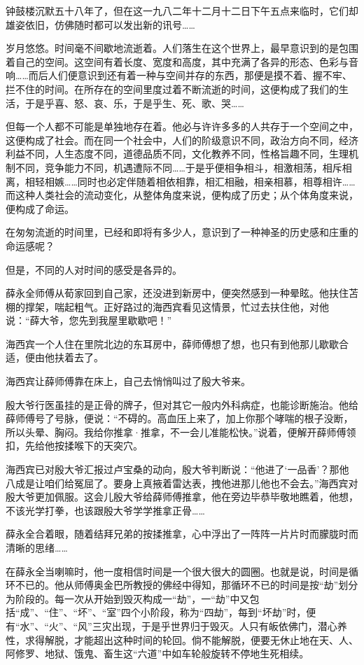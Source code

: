 \par 钟鼓楼沉默五十八年了，但在这一九八二年十二月十二日下午五点来临时，它们却雄姿依旧，仿佛随时都可以发出新的讯号……
\par 岁月悠悠。时间毫不间歇地流逝着。人们落生在这个世界上，最早意识到的是包围着自己的空间。这空间有着长度、宽度和高度，其中充满了各异的形态、色彩与音响……而后人们便意识到还有着一种与空间并存的东西，那便是摸不着、握不牢、拦不住的时间。在所存在的空间里度过着不断流逝的时间，这便构成了我们的生活，于是乎喜、怒、哀、乐，于是乎生、死、歌、哭……
\par 但每一个人都不可能是单独地存在着。他必与许许多多的人共存于一个空间之中，这便构成了社会。而在同一个社会中，人们的阶级意识不同，政治方向不同，经济利益不同，人生态度不同，道德品质不同，文化教养不同，性格旨趣不同，生理机制不同，竞争能力不同，机遇遭际不同……于是乎便相争相斗，相激相荡，相斥相离，相轻相嫉……同时也必定伴随着相依相靠，相汇相融，相亲相慕，相尊相许……而这种人类社会的流动变化，从整体角度来说，便构成了历史；从个体角度来说，便构成了命运。
\par 在匆匆流逝的时间里，已经和即将有多少人，意识到了一种神圣的历史感和庄重的命运感呢？
\par 但是，不同的人对时间的感受是各异的。
\par 薛永全师傅从荀家回到自己家，还没进到新房中，便突然感到一种晕眩。他扶住苫棚的撑架，喘起粗气。正好路过的海西宾看见这情景，忙过去扶住他，对他说：“薛大爷，您先到我屋里歇歇吧！”
\par 海西宾一个人住在里院北边的东耳房中，薛师傅想了想，也只有到他那儿歇歇合适，便由他扶着去了。
\par 海西宾让薛师傅靠在床上，自己去悄悄叫过了殷大爷来。
\par 殷大爷行医虽挂的是正骨的牌子，但对其它一般内外科病症，也能诊断施治。他给薛师傅号了号脉，便说：“不碍的。高血压上来了，加上你那个哮喘的根子没断，所以头晕、胸闷。我给你推拿·推拿，不一会儿准能松快。”说着，便解开薛师傅领扣，先给他按揉喉下的天突穴。
\par 海西宾已对殷大爷汇报过卢宝桑的动向，殷大爷判断说：“他进了‘一品香’？那他八成是让咱们给冤屈了。要身上真掖着雷达表，拽他进那儿他也不会去。”海西宾对殷大爷更加佩服。这会儿殷大爷给薛师傅推拿，他在旁边毕恭毕敬地瞧着，他想，不该光学打拳，也该跟殷大爷学学推拿正骨……
\par 薛永全合着眼，随着结拜兄弟的按揉推拿，心中浮出了一阵阵一片片时而朦胧时而清晰的思绪……
\par 在薛永全当喇嘛时，他一度相信时间是一个很大很大的圆圈。也就是说，时间是循环不已的。他从师傅奥金巴所教授的佛经中得知，那循环不已的时间是按“劫”划分为阶段的。每一次从开始到毁灭构成一“劫”，一“劫”中又包括“成”、“住”、“坏”、“室”四个小阶段，称为“四劫”，每到“坏劫”时，便有“水”、“火”、“风”三灾出现，于是乎世界归于毁灭。人只有皈依佛门，潜心养性，求得解脱，才能超出这种时间的轮回。倘不能解脱，便要无休止地在天、人、阿修罗、地狱、饿鬼、畜生这“六道”中如车轮般旋转不停地生死相续。
